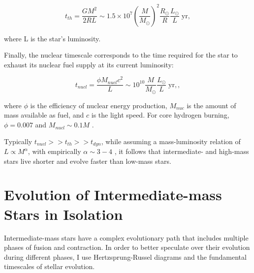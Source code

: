 \begin{equation}\label{eq:thermal_timsecale}
    t_{th} = \frac{G M^2}{2RL} \sim 1.5 \times 10^7 \left( \frac{M}{M_{\odot}} \right)^{2} \frac{R_{\odot}}{R} \frac{L_{\odot}}{L} \; \text{yr},
\end{equation}

where L is the star's luminosity.

Finally, the nuclear timescale corresponds to the time required for the star to exhaust its nuclear fuel supply at its current luminosity: 

\begin{equation}\label{eq:nuclear_timsecale}
    t_{nucl} = \frac{\phi M_{nucl} c^2}{L} \sim 10^{10} \frac{M}{M_{\odot}} \frac{L_{\odot}}{L} \; \text{yr},,
\end{equation}

where $\phi$ is the efficiency of nuclear energy production, $M_{nuc}$ is the amount of mass available as fuel, and $c$ is the light speed. For core hydrogen burning, $\phi = 0.007$ and $M_{nucl} \sim 0.1 M$ \citep{pols2011stellar}.

Typically $t_{nucl} >> t_{th} >> t_{dyn}$, while assuming a mass-luminosity relation of $L \propto M^{\alpha}$, with empirically $\alpha \sim 3-4$ \citep{eker2015main}, it follows that intermediate- and high-mass stars live shorter and evolve faster than low-mass stars.


\section{Evolution of Intermediate-mass Stars in Isolation}\label{sec:single_star_evolution}

Intermediate-mass stars have a complex evolutionary path that includes multiple phases of fusion and contraction. In order to better speculate over their evolution during different phases, I use Hertzsprung-Russel diagrams and the fundamental timescales of stellar evolution.


